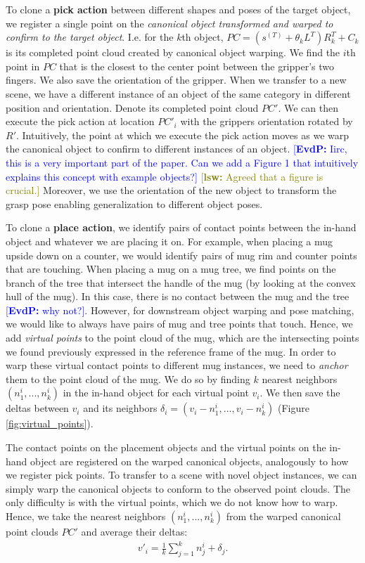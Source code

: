 \documentclass{article}
\newcommand{\evdp}[1]{\textcolor{blue}{[\textbf{EvdP:} #1]}}
\newcommand{\lsw}[1]{\textcolor{olive}{[\textbf{lsw:} #1]}}
\begin{document}
To clone a \textbf{pick action} between different shapes and poses of the target object, we register a single point on the \textit{canonical object transformed and warped to confirm to the target object}. I.e. for the $k$th object, $PC = (s^{(T)} + \theta_k L^T) R_k^T + C_k$ is its completed point cloud created by canonical object warping. We find the $i$th point in $PC$ that is the closest to the center point between the gripper's two fingers. We also save the orientation of the gripper. When we transfer to a new scene, we have a different instance of an object of the same category in different position and orientation. Denote its completed point cloud $PC'$. We can then execute the pick action at location $PC'_i$ with the grippers orientation rotated by $R'$. Intuitively, the point at which we execute the pick action moves as we warp the canonical object to confirm to different instances of an object. \evdp{Iirc, this is a very important part of the paper. Can we add a Figure 1 that intuitively explains this concept with example objects?}
\lsw{Agreed that a figure is crucial.}
Moreover, we use the orientation of the new object to transform the grasp pose enabling generalization to different object poses.

To clone a \textbf{place action}, we identify pairs of contact points between the in-hand object and whatever we are placing it on. For example, when placing a mug upside down on a counter, we would identify pairs of mug rim and counter points that are touching. When placing a mug on a mug tree, we find points on the branch of the tree that intersect the handle of the mug (by looking at the convex hull of the mug). In this case, there is no contact between the mug and the tree \evdp{why not?}. However, for downstream object warping and pose matching, we would like to always have pairs of mug and tree points that touch. Hence, we add \textit{virtual points} to the point cloud of the mug, which are the intersecting points we found previously expressed in the reference frame of the mug. In order to warp these virtual contact points to different mug instances, we need to \textit{anchor} them to the point cloud of the mug. We do so by finding $k$ nearest neighbors $(n^i_1, ..., n^i_k)$ in the in-hand object for each virtual point $v_i$. We then save the deltas between $v_i$ and its neighbors $\delta_i = (v_i - n^i_1, ..., v_i - n^i_k)$ (Figure \ref{fig:virtual_points}).

The contact points on the placement objects and the virtual points on the in-hand object are registered on the warped canonical objects, analogously to how we register pick points. To transfer to a scene with novel object instances, we can simply warp the canonical objects to conform to the observed point clouds. The only difficulty is with the virtual points, which we do not know how to warp. Hence, we take the nearest neighbors $(n^i_1, ..., n^i_k)$ from the warped canonical point clouds $PC'$ and average their deltas:
\begin{align}
    v'_i = \frac{1}{k} \sum_{j=1}^k n^i_j + \delta_j.
\end{align}
\end{document}
